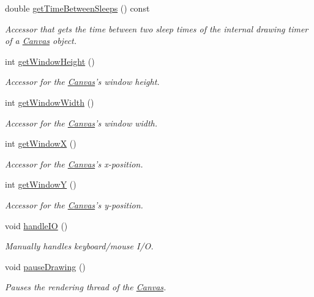 \begin{DoxyCompactItemize}
double \hyperlink{classtsgl_1_1_canvas_a8786d28042b767f5c075361100227af4}{get\-Time\-Between\-Sleeps} () const 
\begin{DoxyCompactList}\small\item\em \-Accessor that gets the time between two sleep times of the internal drawing timer of a \hyperlink{classtsgl_1_1_canvas}{\-Canvas} object. \end{DoxyCompactList}\item 
int \hyperlink{classtsgl_1_1_canvas_ad740ebe5d6bd69ab79cde3e84f369f35}{get\-Window\-Height} ()
\begin{DoxyCompactList}\small\item\em \-Accessor for the \hyperlink{classtsgl_1_1_canvas}{\-Canvas}'s window height. \end{DoxyCompactList}\item 
int \hyperlink{classtsgl_1_1_canvas_a086a0322f4a6ab27da6929b1aa0593af}{get\-Window\-Width} ()
\begin{DoxyCompactList}\small\item\em \-Accessor for the \hyperlink{classtsgl_1_1_canvas}{\-Canvas}'s window width. \end{DoxyCompactList}\item 
int \hyperlink{classtsgl_1_1_canvas_a011ce2354d4565f9d2a323411a47d52d}{get\-Window\-X} ()
\begin{DoxyCompactList}\small\item\em \-Accessor for the \hyperlink{classtsgl_1_1_canvas}{\-Canvas}'s x-\/position. \end{DoxyCompactList}\item 
int \hyperlink{classtsgl_1_1_canvas_ad6e98d17d3e43d79628a3bd05221ee8b}{get\-Window\-Y} ()
\begin{DoxyCompactList}\small\item\em \-Accessor for the \hyperlink{classtsgl_1_1_canvas}{\-Canvas}'s y-\/position. \end{DoxyCompactList}\item 
void \hyperlink{classtsgl_1_1_canvas_aa499851e5e4b97bb99ca4fb3d633c17e}{handle\-I\-O} ()
\begin{DoxyCompactList}\small\item\em \-Manually handles keyboard/mouse \-I/\-O. \end{DoxyCompactList}\item 
void \hyperlink{classtsgl_1_1_canvas_abe021ab5148cc1327523689bced0f35a}{pause\-Drawing} ()
\begin{DoxyCompactList}\small\item\em \-Pauses the rendering thread of the \hyperlink{classtsgl_1_1_canvas}{\-Canvas}. \end{DoxyCompactList}\item 

\end{DoxyCompactItemize}
